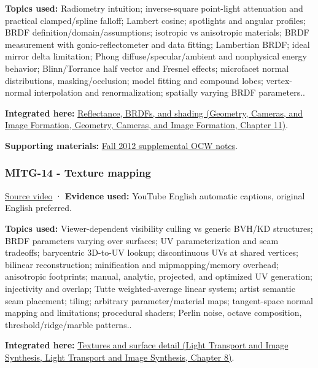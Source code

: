 \textbf{Topics used:} Radiometry intuition; inverse-square point-light attenuation and practical clamped/spline falloff; Lambert cosine; spotlights and angular profiles; BRDF definition/domain/assumptions; isotropic vs anisotropic materials; BRDF measurement with gonio-reflectometer and data fitting; Lambertian BRDF; ideal mirror delta limitation; Phong diffuse/specular/ambient and nonphysical energy behavior; Blinn/Torrance half vector and Fresnel effects; microfacet normal distributions, masking/occlusion; model fitting and compound lobes; vertex-normal interpolation and renormalization; spatially varying BRDF parameters..

\textbf{Integrated here:} \href{../03-Geometry-Cameras-and-Image-Formation/main.pdf\#nameddest=03-visual-computing-i-ch004-reflectance-brdfs-and-shading}{Reflectance, BRDFs, and shading (Geometry, Cameras, and Image Formation, Geometry, Cameras, and Image Formation, Chapter 11)}.

\textbf{Supporting materials:} \href{https://ocw.mit.edu/courses/6-837-computer-graphics-fall-2012/pages/lecture-notes/}{Fall 2012 supplemental OCW notes}.

\subsubsection{MITG-14 - Texture mapping}\label{04-visual-computing-ii-ch036-mitg-14---texture-mapping}

\href{https://www.youtube.com/watch?v=TQTciMjuxrY}{Source video} · \textbf{Evidence used:} YouTube English automatic captions, original English preferred.

\textbf{Topics used:} Viewer-dependent visibility culling vs generic BVH/KD structures; BRDF parameters varying over surfaces; UV parameterization and seam tradeoffs; barycentric 3D-to-UV lookup; discontinuous UVs at shared vertices; bilinear reconstruction; minification and mipmapping/memory overhead; anisotropic footprints; manual, analytic, projected, and optimized UV generation; injectivity and overlap; Tutte weighted-average linear system; artist semantic seam placement; tiling; arbitrary parameter/material maps; tangent-space normal mapping and limitations; procedural shaders; Perlin noise, octave composition, threshold/ridge/marble patterns..

\textbf{Integrated here:} \href{../04-Light-Transport-and-Image-Synthesis/main.pdf\#nameddest=03-visual-computing-i-ch019-textures-and-surface-detail}{Textures and surface detail (Light Transport and Image Synthesis, Light Transport and Image Synthesis, Chapter 8)}.

